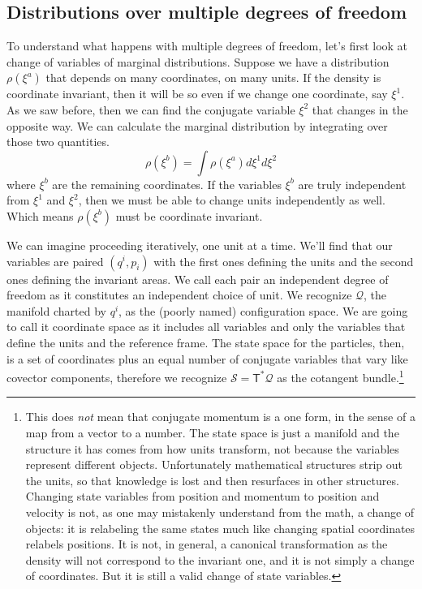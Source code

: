 \documentclass[11pt]{article}
\begin{document}
\subsection*{Distributions over multiple degrees of freedom}

To understand what happens with multiple degrees of freedom, let's first look at change of variables of marginal distributions. Suppose we have a distribution $\rho(\xi^a)$ that depends on many coordinates, on many units. If the density is coordinate invariant, then it will be so even if we change one coordinate, say $\xi^1$. As we saw before, then we can find the conjugate variable $\xi^2$ that changes in the opposite way. We can calculate the marginal distribution by integrating over those two quantities.
\begin{equation}
\rho(\xi^b) = \int \rho(\xi^a) d\xi^1 d\xi^2
\end{equation}
where $\xi^b$ are the remaining coordinates. If the variables $\xi^b$ are truly independent from $\xi^1$ and $\xi^2$, then we must be able to change units independently as well. Which means $\rho(\xi^b)$ must be coordinate invariant.

We can imagine proceeding iteratively, one unit at a time. We'll find that our variables are paired $(q^i, p_i)$  with the first ones defining the units and the second ones defining the invariant areas. We call each pair an independent degree of freedom as it constitutes an independent choice of unit. We recognize $\mathcal{Q}$, the manifold charted by $q^i$, as the (poorly named) configuration space. We are going to call it coordinate space as it includes all variables and only the variables that define the units and the reference frame. The state space for the particles, then, is a set of coordinates plus an equal number of conjugate variables that vary like covector components, therefore we recognize $\mathcal{S}=\mathsf{T}^*\mathcal{Q}$ as the cotangent bundle.\footnote{This does \emph{not} mean that conjugate momentum is a one form, in the sense of a map from a vector to a number. The state space is just a manifold and the structure it has comes from how units transform, not because the variables represent different objects. Unfortunately mathematical structures strip out the units, so that knowledge is lost and then resurfaces in other structures. Changing state variables from position and momentum to position and velocity is not, as one may mistakenly understand from the math, a change of objects: it is relabeling the same states much like changing spatial coordinates relabels positions. It is not, in general, a canonical transformation as the density will not correspond to the invariant one, and it is not simply a change of coordinates. But it is still a valid change of state variables.}
\end{document}
